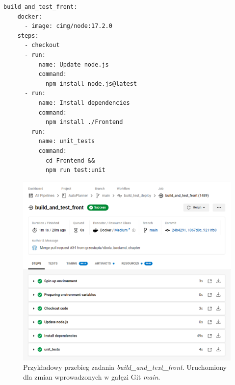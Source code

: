 \begin{lstlisting}[caption=Część skryptu config.yml odpowiadająca za wykonanie zadania \textit{build\_and\_test\_front},label={lst:test_front}]
build_and_test_front:
    docker:
      - image: cimg/node:17.2.0
    steps:
      - checkout
      - run:  
          name: Update node.js
          command:
            npm install node.js@latest
      - run:
          name: Install dependencies
          command:
            npm install ./Frontend
      - run:
          name: unit_tests
          command:
            cd Frontend &&
            npm run test:unit
\end{lstlisting}
\newpage
\begin{figure}[H]
\centering\includegraphics[width=14cm]{figures/circleci_test_front}
\caption{Przykładowy przebieg zadania \textit{build\_and\_text\_front}. Uruchomiony dla zmian wprowadzonych w gałęzi Git \textit{main}.}\label{rys:test_front}
\end{figure}
	
